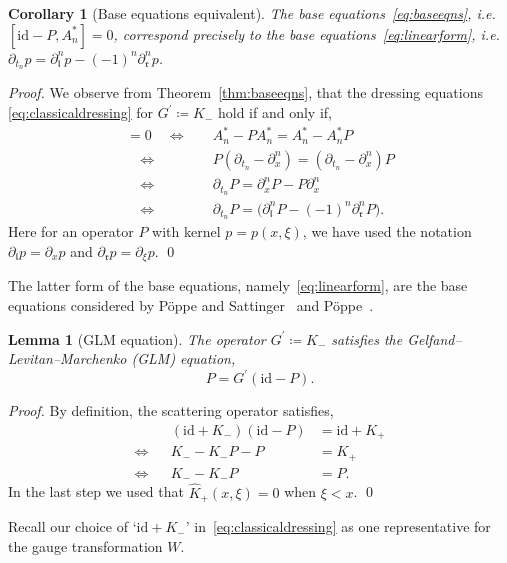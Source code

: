 \documentclass[5p,twocolumn]{elsarticle}
\newcommand*{\id}{{\mathrm{id}}}
\newcommand*{\pa}{{\partial}}
\newcommand*{\el}{\mathfrak l}
\newcommand*{\rl}{\mathfrak r}
\newtheorem{lemma}[theorem]{Lemma}
\newtheorem{corollary}[theorem]{Corollary}
\begin{document}
%
\begin{corollary}[Base equations equivalent]\label{cor:samebaseeqns}
  The base equations~\eqref{eq:baseeqns}, i.e.\/ $[\id-P,A_n^\ast]=0$, correspond precisely to the base equations~\eqref{eq:linearform}, i.e.\/ $ \pa_{t_n}p=\pa_{\el}^np-(-1)^n\pa_{\rl}^np$.
\end{corollary}
%
\begin{proof}
  We observe from Theorem~\ref{thm:baseeqns}, that the dressing equations \eqref{eq:classicaldressing} for $G^\prime\coloneqq K_-$ hold if and only if,
  \begin{align*}
    [\id-P,A_n^\ast]=0
    \quad\Leftrightarrow\quad & A_n^\ast-PA_n^\ast=A_n^\ast-A_n^\ast P\\
    \quad\Leftrightarrow\quad & P(\pa_{t_n}-\pa_x^n)=(\pa_{t_n}-\pa_x^n)P\\
    \quad\Leftrightarrow\quad & \pa_{t_n}P=\pa_x^nP-P\pa_x^n\\
    \quad\Leftrightarrow\quad & \pa_{t_n}P=\bigl(\pa_{\el}^nP-(-1)^n\pa_{\rl}^nP\bigr).
  \end{align*}
  Here for an operator $P$ with kernel $p=p(x,\xi)$, we have used the notation $\pa_{\el}p=\pa_x p$ and $\pa_{\rl}p=\pa_\xi p$.
\qed
\end{proof}
%
\begin{remark}
  The latter form of the base equations, namely~\eqref{eq:linearform}, are the base equations considered by P\"oppe and Sattinger~\cite[eq.~2.4]{PoppeSattinger} and P\"oppe~\cite[eq.~3.6]{PKP}.
\end{remark}
%
\begin{lemma}[GLM equation]\label{lemma:GLM}
The operator $G^\prime\coloneqq K_-$ satisfies the Gelfand--Levitan--Marchenko (GLM) equation,
\begin{equation}\label{eq:GLM}
P=G^\prime(\id-P). 
\end{equation}
\end{lemma}
%
\begin{proof}
  By definition, the scattering operator satisfies,
  \begin{align*}
                    &&  (\id+K_-)(\id-P)&=\id+K_+\\
    \Leftrightarrow && K_--K_-P-P&=K_+\\
    \Leftrightarrow && K_--K_-P&=P.
  \end{align*}
  In the last step we used that $\hat{K}_+(x,\xi)=0$ when $\xi<x$. 
\qed
\end{proof}
%
Recall our choice of `$\id+K_-$' in~\eqref{eq:classicaldressing} as one representative for the gauge transformation $W$.
\end{document}
